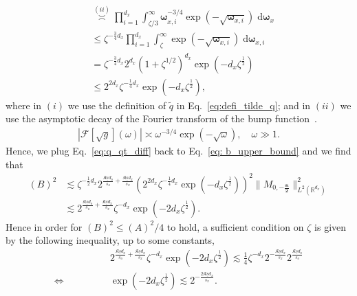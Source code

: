 \documentclass[11pt]{article}
\newcommand{\bomega}{\boldsymbol{\omega}}
\newcommand{\calF}{\mathcal{F}}
\newcommand{\0}{\mathbf{0}}
\begin{document}
\begin{appendix}
\begin{align}
    &\stackrel{(ii)}{\asymp} \prod_{i=1}^{d_x} \int_{\zeta/3}^{\infty} \bomega_{x,i}^{-3/4} \exp(-\sqrt{\bomega_{x,i}}) \;\mathrm{d}\bomega_x \nonumber\\
    &\leq \zeta^{-\frac{3}{4}d_x} \prod_{i=1}^{d_x}  \int_{\zeta}^\infty \exp(-\sqrt{\bomega_{x,i}}) \;\mathrm{d}\bomega_{x,i} \nonumber \\
    &= \zeta^{-\frac{3}{4}d_x} 2^{d_x}\left(1+\zeta^{1 / 2}\right)^{d_x} \exp\left(-d_x \zeta^{\frac{1}{2}}\right) \nonumber \\
    &\leq 2^{2d_x} \zeta^{-\frac{1}{4}d_x} \exp\left(-d_x \zeta^{\frac{1}{2}}\right),
    \label{eq:q_qt_diff}
\end{align}
where in $(i)$ we use the definition of $\tilde{q}$ in Eq.~\eqref{eq:defi_tilde_q}; and in $(ii)$
we use the asymptotic decay of the Fourier transform of the bump function~\citep[Section 2]{johnson2015saddle}. 
\begin{align}
\label{eq:bump_function_fourier_decay}
    \left|\calF[\sqrt{g}](\omega) \right| \asymp \omega^{-3/4} \exp(-\sqrt{\omega}), \quad \omega \gg 1.
\end{align}
Hence, we plug Eq.~\eqref{eq:q_qt_diff} back to Eq.~\eqref{eq: b_upper_bound} and we find that
\begin{align}\label{eq:upper_B}
    (B)^2 &\lesssim \zeta^{-\frac{1}{2}d_x} 2^{\frac{\mathfrak{K}\underline{s}d_o}{s_o} + \frac{\mathfrak{K}\underline{s}d_x}{s_x}}\left(2^{2d_x} \zeta^{-\frac{1}{4}d_x} \exp\left(-d_x \zeta^{\frac{1}{2}}\right)\right)^2 \|M_{0,\boldsymbol{-\frac{\mathfrak{m}}{2}}}\|_{L^2(\mathbb{R}^{d_x})}^2\nonumber\\ &\lesssim 2^{\frac{\mathfrak{K}\underline{s}d_o}{s_o} + \frac{\mathfrak{K}\underline{s}d_x}{s_x}} \zeta^{-d_x} \exp\left(-2 d_x \zeta^{\frac{1}{2}}\right).
\end{align}
Hence in order for $(B)^2\leq (A)^2/4$ to hold, a sufficient condition on $\zeta$ is given by the following inequality, up to some constants,
\begin{align}
    &2^{\frac{\mathfrak{K}\underline{s}d_o}{s_o} + \frac{\mathfrak{K}\underline{s}d_x}{s_x}} \zeta^{-d_x}\exp\left(-2 d_x \zeta^{\frac{1}{2}}\right)  \lesssim \frac{1}{4} \zeta^{-d_x}2^{-\frac{\mathfrak{K}\underline{s}d_x}{s_x}}2^{\frac{\mathfrak{K}\underline{s}d_o}{s_o}}\nonumber\\
    \iff \qquad\qquad & \exp\left(-2 d_x \zeta^{\frac{1}{2}}\right) \lesssim 2^{-\frac{2\mathfrak{K}\underline{s}d_x}{s_x}}. \label{eq:zeta_one}
\end{align}

\end{appendix}
\end{document}
